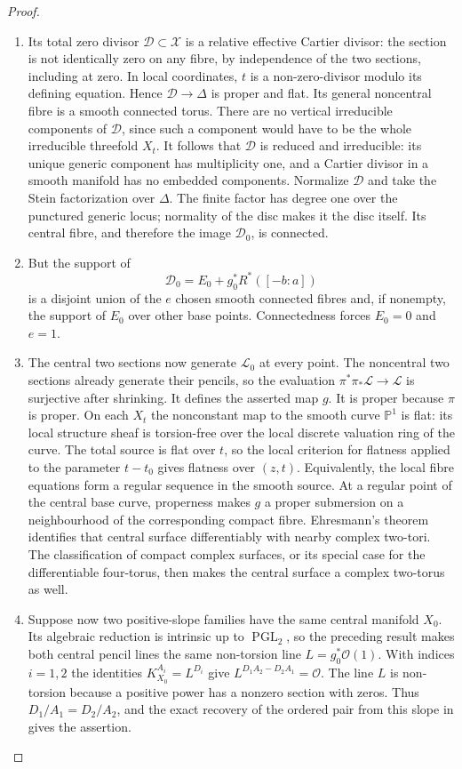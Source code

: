 \begin{proof}
\begin{enumerate}[label={$\langle1\rangle$\arabic*.},leftmargin=*]
\item Its total zero divisor $\mathcal D\subset\mathcal X$ is a
relative effective Cartier divisor: the section is not
identically zero on any fibre, by independence of the two
sections, including at zero.  In local coordinates, $t$ is
a non-zero-divisor modulo its defining equation.  Hence
$\mathcal D\to\Delta$ is proper and flat.  Its general
noncentral fibre is a smooth connected torus.  There are no
vertical irreducible components of $\mathcal D$, since such
a component would have to be the whole irreducible
threefold $X_t$.  It follows that $\mathcal D$ is reduced
and irreducible: its unique generic component has multiplicity
one, and a Cartier divisor in a smooth manifold has no
embedded components.  Normalize $\mathcal D$ and take the
Stein factorization over $\Delta$.  The finite factor has
degree one over the punctured generic locus; normality of
the disc makes it the disc itself.  Its central fibre, and
therefore the image $\mathcal D_0$, is connected.

\item But the support of
\[
 \mathcal D_0=E_0+g_0^*R^*([-b:a])
\]
is a disjoint union of the $e$ chosen smooth connected fibres
and, if nonempty, the support of $E_0$ over other base points.
Connectedness forces $E_0=0$ and $e=1$.

\item The central two sections now generate $\mathcal L_0$ at
every point.  The noncentral two sections already generate
their pencils, so the evaluation
$\pi^*\pi_*\mathcal L\to\mathcal L$ is surjective after
shrinking.  It defines the asserted map $g$.  It is proper
because $\pi$ is proper.  On each $X_t$ the nonconstant
map to the smooth curve $\mathbb P^1$ is flat: its local
structure sheaf is torsion-free over the local discrete
valuation ring of the curve.  The total source is flat
over $t$, so the local criterion for flatness applied to
the parameter $t-t_0$ gives flatness over $(z,t)$.
Equivalently, the local fibre equations form a regular
sequence in the smooth source.  At a regular
point of the central base curve, properness makes $g$ a
proper submersion on a neighbourhood of the corresponding
compact fibre.  Ehresmann's theorem identifies that central
surface differentiably with nearby complex two-tori.
The classification of compact complex surfaces, or its
special case for the differentiable four-torus, then makes
the central surface a complex two-torus as well.

\item Suppose now two positive-slope families have the same
central manifold $X_0$.  Its algebraic reduction is intrinsic
up to $\operatorname{PGL}_2$, so the preceding result makes
both central pencil lines the same non-torsion line
$L=g_0^*\mathcal O(1)$.  With indices $i=1,2$ the identities
$K_{X_0}^{A_i}=L^{D_i}$ give
$L^{D_1A_2-D_2A_1}=\mathcal O$.  The line $L$ is non-torsion
because a positive power has a nonzero section with zeros.
Thus $D_1/A_1=D_2/A_2$, and the exact recovery of the ordered
pair from this slope in  gives the assertion.


\end{enumerate}
\end{proof}
